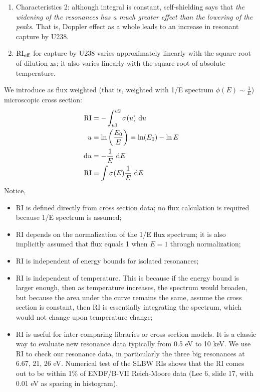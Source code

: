 \documentclass{school-22.211-notes}
\begin{document}
\begin{enumerate}
\begin{enumerate}
\item Characteristics 2: although integral is constant, self-shielding says that \textit{the widening of the resonances has a much greater effect than the lowering of the peaks}. That is, Doppler effect as a whole leads to an increase in resonant capture by U238. 
\item $\mathrm{RI}_{\mathrm{eff}}$ for capture by U238 varies approximately linearly with the square root of dilution xs; it also varies linearly with the square root of absolute temperature. 
\end{enumerate}

\end{enumerate}



We introduce  as flux weighted (that is, weighted with 1/E spectrum $\phi(E) \sim \frac{1}{E}$) microscopic cross section: 
\begin{align}
\mathrm{RI} &=  - \int_{u1}^{u2} \sigma(u) \mbox{ }\mathrm{d} u \\
u &= \ln \left( \frac{E_0}{E} \right) = \ln(E_0) - \ln E \\
\mbox{ }\mathrm{d} u &= - \frac{1}{E} \mbox{ }\mathrm{d} E \\ 
\mathrm{RI} &=  \int \sigma (E) \frac{1}{E} \mbox{ }\mathrm{d} E 
\end{align}
Notice, 
\begin{itemize}
\item RI is defined directly from cross section data; no flux calculation is required because 1/E spectrum is assumed; 
\item RI depends on the normalization of the 1/E flux spectrum; it is also implicitly assumed that flux equals 1 when $E = 1$ through normalization;
\item RI is independent of energy bounds for isolated resonances;
\item RI is independent of temperature. This is because if the energy bound is larger enough, then as temperature increases, the spectrum would broaden, but because the area under the curve remains the same, assume the cross section is constant, then RI is essentially integrating the spectrum, which would not change upon temperature change;
\item RI is useful for inter-comparing libraries or cross section models. It is a classic way to evaluate new resonance data typically from 0.5 eV to 10 keV. We use RI to check our resonance data, in particularly the three big resonances at 6.67, 21, 26 eV. Numerical test of the SLBW RIs shows that the RI comes out to be within 1\% of ENDF/B-VII Reich-Moore data (Lec 6, slide 17, with 0.01 eV as spacing in histogram). 
\end{itemize}
\end{document}
